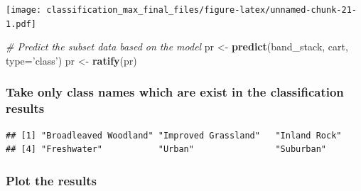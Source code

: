 \documentclass[]{article}
\newenvironment{Shaded}{\begin{snugshade}}{\end{snugshade}}
\newcommand{\CommentTok}[1]{\textcolor[rgb]{0.56,0.35,0.01}{\textit{#1}}}
\newcommand{\ControlFlowTok}[1]{\textcolor[rgb]{0.13,0.29,0.53}{\textbf{#1}}}
\newcommand{\DataTypeTok}[1]{\textcolor[rgb]{0.13,0.29,0.53}{#1}}
\newcommand{\DecValTok}[1]{\textcolor[rgb]{0.00,0.00,0.81}{#1}}
\newcommand{\FloatTok}[1]{\textcolor[rgb]{0.00,0.00,0.81}{#1}}
\newcommand{\KeywordTok}[1]{\textcolor[rgb]{0.13,0.29,0.53}{\textbf{#1}}}
\newcommand{\NormalTok}[1]{#1}
\newcommand{\OperatorTok}[1]{\textcolor[rgb]{0.81,0.36,0.00}{\textbf{#1}}}
\newcommand{\OtherTok}[1]{\textcolor[rgb]{0.56,0.35,0.01}{#1}}
\newcommand{\StringTok}[1]{\textcolor[rgb]{0.31,0.60,0.02}{#1}}
\begin{document}
\texttt{[image: classification\_max\_final\_files/figure-latex/unnamed-chunk-21-1.pdf]}

\begin{Shaded}
\begin{Highlighting}[]
\CommentTok{# Predict the subset data based on the model}
\NormalTok{pr <-}\StringTok{ }\KeywordTok{predict}\NormalTok{(band_stack, cart, }\DataTypeTok{type=}\StringTok{'class'}\NormalTok{)}
\NormalTok{pr <-}\StringTok{ }\KeywordTok{ratify}\NormalTok{(pr)}
\end{Highlighting}
\end{Shaded}

\hypertarget{take-only-class-names-which-are-exist-in-the-classification-results}{%
\subsubsection{Take only class names which are exist in the
classification
results}\label{take-only-class-names-which-are-exist-in-the-classification-results}}

\begin{Shaded}
\end{Shaded}

\begin{verbatim}
## [1] "Broadleaved Woodland" "Improved Grassland"   "Inland Rock"         
## [4] "Freshwater"           "Urban"                "Suburban"
\end{verbatim}

\hypertarget{plot-the-results-1}{%
\subsubsection{Plot the results}\label{plot-the-results-1}}

\begin{Shaded}
\end{Shaded}
\end{document}
